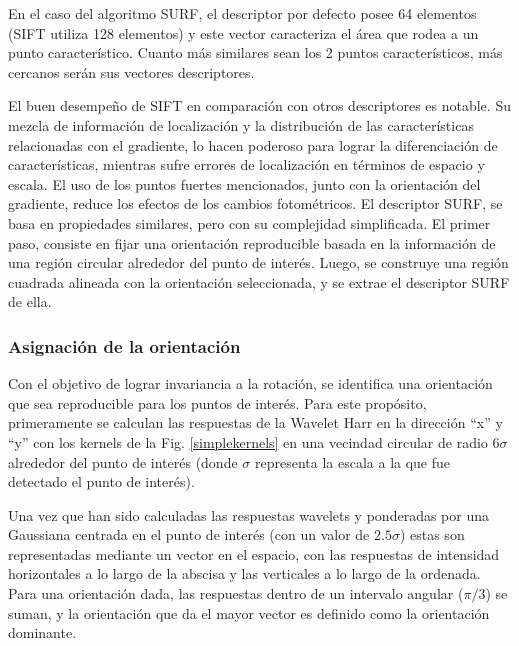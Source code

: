 \documentclass[a4paper,11pt,spanish]{article}
\begin{document}


En el caso del algoritmo SURF, el descriptor por defecto %
posee 64 elementos (SIFT utiliza 128 elementos) y este vector caracteriza el %
área que rodea a un punto característico. Cuanto más similares sean los 2 puntos característicos, más cercanos serán sus vectores descriptores.



El buen desempeño de SIFT en comparación con otros descriptores es notable. Su mezcla de información de localización %
y la distribución de las características relacionadas con el gradiente, lo hacen poderoso para lograr la diferenciación de características, mientras sufre errores de localización en términos de espacio y escala. El uso de los puntos fuertes mencionados, junto con la orientación del gradiente, reduce los efectos de los cambios fotométricos. El descriptor SURF, %
se basa en propiedades similares, pero con su complejidad simplificada. El primer paso, consiste en fijar una orientación reproducible basada en la información de una región circular alrededor del punto de interés. Luego, se construye una región cuadrada alineada con la orientación seleccionada, y se extrae el descriptor SURF de ella.
\subsubsection{Asignación de la orientación}
\label{asignacion_orientacion_susbsection}
Con el objetivo de lograr invariancia a la rotación, se identifica una orientación que sea reproducible para los puntos de interés. Para este propósito, primeramente se calculan las respuestas de la Wavelet Harr en la dirección ``x'' y ``y'' con los kernels de la Fig. \ref{simplekernels} en una vecindad circular de radio $6\sigma$ alrededor del punto de interés (donde $\sigma$ representa la escala a la que fue detectado el punto de interés).


Una vez que han sido calculadas las respuestas wavelets y ponderadas por una Gaussiana centrada en el punto de interés (con un valor de $2.5\sigma$) estas son representadas mediante un vector en el espacio, con las respuestas de intensidad horizontales a lo largo de la abscisa y las verticales a lo largo de la ordenada. Para una orientación dada, las respuestas dentro de un intervalo angular ($\pi/3$) se suman, y la orientación que da el mayor vector es definido como la orientación dominante.
\end{document}
